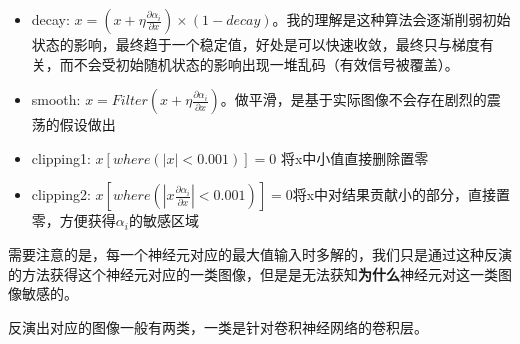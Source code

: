 \documentclass[UTF8]{article}
\begin{document}
\begin{itemize}
	\item decay: $x =(x+\eta\frac{\partial\alpha_i}{\partial x})\times (1-decay)$。我的理解是这种算法会逐渐削弱初始状态的影响，最终趋于一个稳定值，好处是可以快速收敛，最终只与梯度有关，而不会受初始随机状态的影响出现一堆乱码（有效信号被覆盖）。
	\item smooth: $x = Filter(x+\eta\frac{\partial\alpha_i}{\partial x})$。做平滑，是基于实际图像不会存在剧烈的震荡的假设做出
	\item clipping1: $x[where(\left|x\right|<0.001)]=0$ 将x中小值直接删除置零
	\item clipping2: $x[where(\left|x\frac{\partial\alpha_i}{\partial x}\right|<0.001)]=0$将x中对结果贡献小的部分，直接置零，方便获得$\alpha_i$的敏感区域
\end{itemize}
需要注意的是，每一个神经元对应的最大值输入时多解的，我们只是通过这种反演的方法获得这个神经元对应的一类图像，但是是无法获知\textbf{为什么}神经元对这一类图像敏感的。\par

反演出对应的图像一般有两类，一类是针对卷积神经网络的卷积层。
% 
% 
\end{document}
